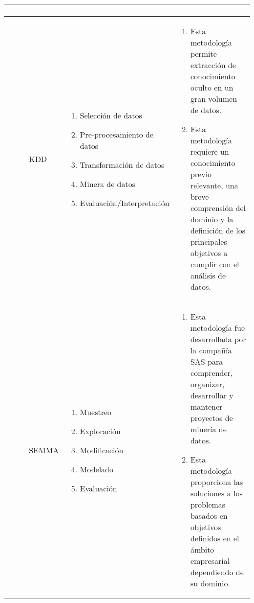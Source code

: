 \begin{table*}[!htb]
\begin{threeparttable}
\begin{tabular}{ p{1cm} p{2cm} p{5cm} p{6.5cm}   }
\begin{enumerate}
			\end{enumerate}
			\\ \hline
			\cite{Safhi2019}
			& KDD
			&  \begin{enumerate}
				\item Selección de datos  
				\item Pre-procesamiento de datos 
				\item Transformación de datos
				\item Minera de datos 
				\item Evaluación/Interpretación
			\end{enumerate}
			& \begin{enumerate}
				\item Esta metodología permite extracción de conocimiento oculto en un gran volumen de datos. 
				\item Esta metodología requiere un conocimiento previo relevante, una breve comprensión del dominio y la definición de los principales objetivos a cumplir con el análisis de datos. 
			\end{enumerate}
			\\ \hline
			\cite{Shafique2014}
			& SEMMA
			&  \begin{enumerate}
				\item Muestreo 
				\item Exploración
				\item Modificación
				\item Modelado
				\item Evaluación
			\end{enumerate}
			& \begin{enumerate}
				\item Esta metodología fue desarrollada por la compañía SAS para comprender, organizar, desarrollar y mantener proyectos de minería de datos.
				\item Esta metodología proporciona las soluciones a los problemas basados en objetivos definidos en el ámbito empresarial dependiendo de su dominio.
			\end{enumerate}
		\end{tabular}
	\end{threeparttable}
\end{table*}

